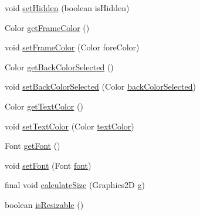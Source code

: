 \begin{DoxyCompactItemize}
\item 
void \hyperlink{classorg_1_1tzi_1_1use_1_1gui_1_1views_1_1diagrams_1_1elements_1_1_placeable_node_a6946f49ada339c2e100e669dc57249a4}{set\-Hidden} (boolean is\-Hidden)
\item 
Color \hyperlink{classorg_1_1tzi_1_1use_1_1gui_1_1views_1_1diagrams_1_1elements_1_1_placeable_node_acc8466b28fac07c915acf678a214a77d}{get\-Frame\-Color} ()
\item 
void \hyperlink{classorg_1_1tzi_1_1use_1_1gui_1_1views_1_1diagrams_1_1elements_1_1_placeable_node_a1c3e2ad18855ec34bfd89e81577bbde3}{set\-Frame\-Color} (Color fore\-Color)
\item 
Color \hyperlink{classorg_1_1tzi_1_1use_1_1gui_1_1views_1_1diagrams_1_1elements_1_1_placeable_node_a01f864672a83fd5df0d1df0d78f49bc0}{get\-Back\-Color\-Selected} ()
\item 
void \hyperlink{classorg_1_1tzi_1_1use_1_1gui_1_1views_1_1diagrams_1_1elements_1_1_placeable_node_afc31275e032400b17264c243baea303c}{set\-Back\-Color\-Selected} (Color \hyperlink{classorg_1_1tzi_1_1use_1_1gui_1_1views_1_1diagrams_1_1elements_1_1_placeable_node_adc74a41bc4ce7dd19ad0fb6f1fb0407e}{back\-Color\-Selected})
\item 
Color \hyperlink{classorg_1_1tzi_1_1use_1_1gui_1_1views_1_1diagrams_1_1elements_1_1_placeable_node_a2b337fca8698a572adc70025e3946eb0}{get\-Text\-Color} ()
\item 
void \hyperlink{classorg_1_1tzi_1_1use_1_1gui_1_1views_1_1diagrams_1_1elements_1_1_placeable_node_a270cde4677bafaf2661621c4e19c0614}{set\-Text\-Color} (Color \hyperlink{classorg_1_1tzi_1_1use_1_1gui_1_1views_1_1diagrams_1_1elements_1_1_placeable_node_a875879f3e5c9d237f86c82f253f8173c}{text\-Color})
\item 
Font \hyperlink{classorg_1_1tzi_1_1use_1_1gui_1_1views_1_1diagrams_1_1elements_1_1_placeable_node_a2feba6abae72fbc7d77612ee2ed9270a}{get\-Font} ()
\item 
void \hyperlink{classorg_1_1tzi_1_1use_1_1gui_1_1views_1_1diagrams_1_1elements_1_1_placeable_node_adc682ccd2c5b8acdb232e27b80aaa2d9}{set\-Font} (Font \hyperlink{classorg_1_1tzi_1_1use_1_1gui_1_1views_1_1diagrams_1_1elements_1_1_placeable_node_af4388194b24b4b30c30c5159498a4625}{font})
\item 
final void \hyperlink{classorg_1_1tzi_1_1use_1_1gui_1_1views_1_1diagrams_1_1elements_1_1_placeable_node_aa155c3cb294bb2e5decd9d7e29943fcf}{calculate\-Size} (Graphics2\-D g)
\item 
boolean \hyperlink{classorg_1_1tzi_1_1use_1_1gui_1_1views_1_1diagrams_1_1elements_1_1_placeable_node_aab174b2d34bbc6afce496fd202ae1658}{is\-Resizable} ()

\end{DoxyCompactItemize}
